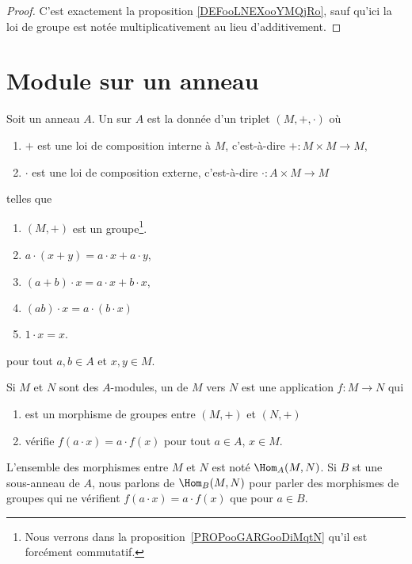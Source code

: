 \begin{proof}
	C'est exactement la proposition \ref{DEFooLNEXooYMQjRo}, sauf qu'ici la loi de groupe est notée multiplicativement au lieu d'additivement.
\end{proof}



\section{Module sur un anneau}

\begin{definition}       \label{DEFooHXITooBFvzrR}
	Soit un anneau \( A\). Un  sur \( A\) est la donnée d'un triplet \( (M,+,\cdot)\) où
	\begin{enumerate}
		\item
		      \( +\) est une loi de composition interne à \( M\), c'est-à-dire \( +\colon M\times M\to M\),
		\item
		      \( \cdot\) est une loi de composition externe, c'est-à-dire \( \cdot\colon A\times M\to M\)
	\end{enumerate}
	telles que
	\begin{enumerate}
		\item
		      \( (M,+)\) est un groupe\footnote{Nous verrons dans la proposition~\ref{PROPooGARGooDiMqtN} qu'il est forcément commutatif.}.
		\item
		      \( a\cdot(x+y)=a\cdot x+a\cdot y\),
		\item
		      \( (a+b)\cdot x=a\cdot x+b\cdot x\),
		\item
		      \( (ab)\cdot x=a\cdot(b\cdot x)\)
		\item
		      \( 1\cdot x=x\).
	\end{enumerate}
	pour tout \( a,b\in A\) et \( x,y\in M\).

	Si \( M\) et \( N\) sont des \( A\)-modules, un  de \( M\) vers \( N\) est une application \( f\colon M\to N\) qui
	\begin{enumerate}
		\item
		      est un morphisme de groupes entre \( (M,+)\) et \( (N,+)\)
		\item
		      vérifie \( f(a\cdot x)=a\cdot f(x)\) pour tout \( a\in A\), \( x\in M\).
	\end{enumerate}
	L'ensemble des morphismes entre \( M\) et \( N\) est noté \( \Hom_A(M,N)\). Si \( B\) st une sous-anneau de \( A\),  nous parlons de \( \Hom_B(M,N)\) pour parler des morphismes de groupes qui ne vérifient \( f(a\cdot x)=a\cdot f(x)\) que pour \( a\in B\).
\end{definition}

